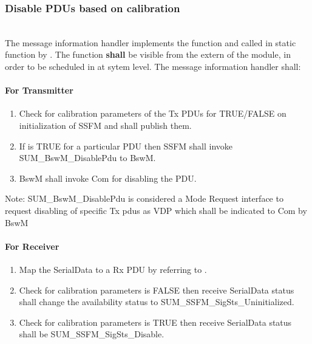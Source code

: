 \subsubsection{Disable PDUs based on calibration}
\label{sec:Disable_pdus}
\label{sec:Disable_pdus}
\\
The message information handler implements the function  and called in static function  by .
The function  \textbf{shall} be visible from the extern of the module, in order to be scheduled in  at sytem level.
The message information handler shall:
\paragraph{For Transmitter}
\begin{enumerate}
    \item Check for calibration parameters  of the Tx PDUs for TRUE/FALSE on initialization of SSFM and shall publish them.
    \item If  is TRUE for a particular PDU then SSFM shall invoke SUM_BswM_DisablePdu to BswM.
    \item BswM shall invoke Com for disabling the PDU.
\end{enumerate}
Note: SUM_BswM_DisablePdu is considered a Mode Request interface to request disabling of specific Tx pdus as VDP which shall be indicated to Com by BswM

\paragraph{For Receiver}
\begin{enumerate}
    \item Map the SerialData to a Rx PDU by referring to .
    \item Check for calibration parameters  is FALSE then receive SerialData status shall change the availability status to SUM_SSFM_SigSts_Uninitialized.
    \item Check for calibration parameters  is TRUE then receive SerialData status shall be SUM_SSFM_SigSts_Disable.
    \end{enumerate}
{      }

